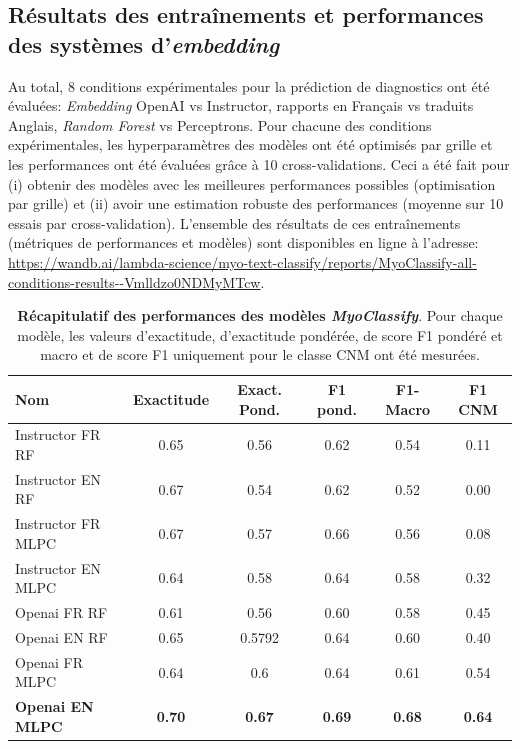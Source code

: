 \subsection{Résultats des entraînements et performances des systèmes d'\textit{embedding}}
Au total, 8 conditions expérimentales pour la prédiction de diagnostics ont été évaluées: \textit{Embedding} OpenAI vs Instructor, rapports en Français vs traduits Anglais, \textit{Random Forest} vs Perceptrons. Pour chacune des conditions expérimentales, les hyperparamètres des modèles ont été optimisés par grille et les performances ont été évaluées grâce à 10 cross-validations. Ceci a été fait pour (i) obtenir des modèles avec les meilleures performances possibles (optimisation par grille) et (ii) avoir une estimation robuste des performances (moyenne sur 10 essais par cross-validation). L'ensemble des résultats de ces entraînements (métriques de performances et modèles) sont disponibles en ligne à l'adresse: \url{https://wandb.ai/lambda-science/myo-text-classify/reports/MyoClassify-all-conditions-results--Vmlldzo0NDMyMTcw}.
\begin{table}[!ht]
\centering
\caption[Récapitulatif des performances des modèles \textit{MyoClassify}]{\textbf{Récapitulatif des performances des modèles \textit{MyoClassify}}. Pour chaque modèle, les valeurs d'exactitude, d'exactitude pondérée, de score F1 pondéré et macro et de score F1 uniquement pour le classe CNM ont été mesurées.}
\label{tab:myoclassify_metrics}
\begin{tabularx}{\textwidth}{|X|c|c|c|c|c|}
\hline
\textbf{Nom} & \textbf{Exactitude} & \textbf{Exact. Pond.} & \textbf{F1 pond.} & \textbf{F1-Macro} & \textbf{F1 CNM} \\\hline
Instructor FR RF & 0.65 & 0.56 & 0.62 & 0.54 & 0.11 \\ \hline
Instructor EN RF & 0.67 & 0.54 & 0.62 & 0.52 & 0.00 \\ \hline
Instructor FR MLPC & 0.67 & 0.57 & 0.66 & 0.56 & 0.08 \\ \hline
Instructor EN MLPC & 0.64 & 0.58 & 0.64 & 0.58 & 0.32 \\ \hline
Openai FR RF & 0.61 & 0.56 & 0.60 & 0.58 & 0.45 \\ \hline
Openai EN RF & 0.65 & 0.5792 & 0.64 & 0.60 & 0.40 \\ \hline
Openai FR MLPC & 0.64 & 0.6 & 0.64 & 0.61 & 0.54 \\ \hline
\textbf{Openai EN MLPC} & \textbf{0.70} &\textbf{0.67}& \textbf{0.69} &\textbf{ 0.68} & \textbf{0.64} \\ \hline
\end{tabularx}
\end{table}
